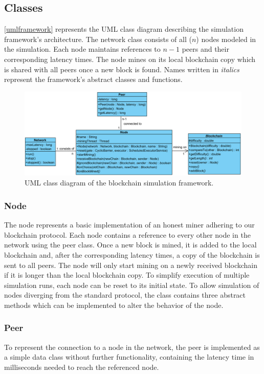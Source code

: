 \documentclass[a4paper,12pt,twoside]{report}
\begin{document}
\subsection{Classes}
\autoref{umlframework} represents the UML class diagram describing the simulation framework's architecture. The network class consists of all ($n$) nodes modeled in the simulation. Each node maintains references to $n-1$ peers and their corresponding latency times. The node mines on its local blockchain copy which is shared with all peers once a new block is found. Names written in \textit{italics} represent the framework's abstract classes and functions.
\begin{figure}[ht]
	\centering
  \includegraphics[width=\textwidth]{Framework.png}
	\caption{UML class diagram of the blockchain simulation framework.}
	\label{umlframework}
\end{figure}

\subsubsection{Node}
The node represents a basic implementation of an honest miner adhering to our blockchain protocol. Each node contains a reference to every other node in the network using the peer class. Once a new block is mined, it is added to the local blockchain and, after the corresponding latency times, a copy of the blockchain is sent to all peers. The node will only start mining on a newly received blockchain if it is longer than the local blockchain copy. To simplify execution of multiple simulation runs, each node can be reset to its initial state. To allow simulation of nodes diverging from the standard protocol, the class contains three abstract methods which can be implemented to alter the behavior of the node. 

\subsubsection{Peer}
To represent the connection to a node in the network, the peer is implemented as a simple data class without further functionality, containing the latency time in milliseconds needed to reach the referenced node.
\end{document}
